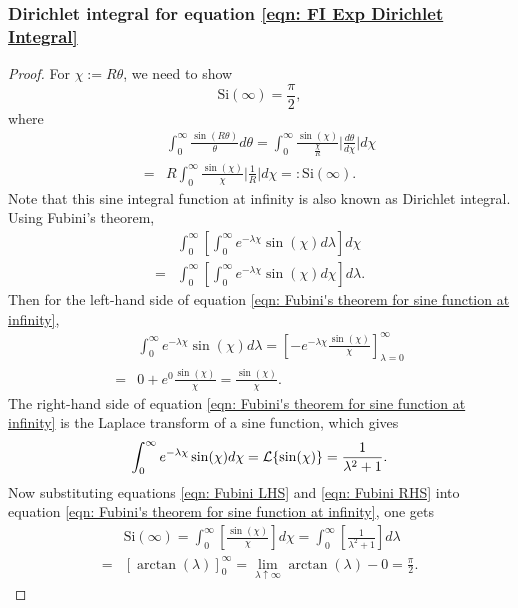 \documentclass[%
 reprint,
 amsmath,amssymb,
 aps,
]{revtex4-2}
\begin{document}
\subsubsection{Dirichlet integral for equation \eqref{eqn: FI Exp Dirichlet Integral}}
\begin{proof}
    For $\chi := R\theta$, we need to show
    \begin{equation*}
        \text{Si}(\infty) = \frac{\pi}{2},
    \end{equation*}
    where
    \begin{align*}
        & \int_0^\infty \frac{\sin(R\theta)}{\theta} d\theta
        = \int_0^\infty \frac{\sin(\chi)}{\frac{\chi}{R}} \bigg|\frac{d\theta}{d\chi}\bigg| d\chi \\
        = & R \int_0^\infty \frac{\sin(\chi)}{\chi} \bigg|\frac{1}{R}\bigg| d\chi 
        =: \text{Si}(\infty).
    \end{align*}
    Note that this sine integral function at infinity is also known as Dirichlet integral.
    Using Fubini's theorem,
    \begin{align} \label{eqn: Fubini's theorem for sine function at infinity}
        & \int_0^\infty\left[\int_0^\infty e^{-\lambda\chi}\sin(\chi)d\lambda\right]d\chi \\
        = & \int_0^\infty\left[\int_0^\infty e^{-\lambda\chi}\sin(\chi)d\chi\right]d\lambda.
    \end{align}
    Then for the left-hand side of equation \eqref{eqn: Fubini's theorem for sine function at infinity},
    \begin{align} \label{eqn: Fubini LHS}
        & \int_0^\infty e^{-\lambda\chi}\sin(\chi)d\lambda = \left[-e^{-\lambda\chi}\frac{\sin(\chi)}{\chi} \right]_{\lambda = 0}^\infty \\
        = & 0 + e^0\frac{\sin(\chi)}{\chi} = \frac{\sin(\chi)}{\chi}.
    \end{align}
    The right-hand side of equation \eqref{eqn: Fubini's theorem for sine function at infinity} is the Laplace transform of a sine function, which gives
    \begin{equation} \label{eqn: Fubini RHS}
        \int_0^\infty e^{-\lambda\chi}\sin(\chi)d\chi \\
        = \mathcal{L}\{\sin(\chi)\} = \frac{1}{\lambda^2 + 1}.
    \end{equation}
    Now substituting equations \eqref{eqn: Fubini LHS} and \eqref{eqn: Fubini RHS} into equation \eqref{eqn: Fubini's theorem for sine function at infinity}, one gets
    \begin{align*}
        & \text{Si}(\infty) = \int_0^\infty\left[\frac{\sin(\chi)}{\chi}\right]d\chi = \int_0^\infty\left[\frac{1}{\lambda^2 + 1}\right]d\lambda \\
        = & [\arctan(\lambda)]_0^\infty
        = \lim_{\lambda \uparrow \infty}\arctan(\lambda) - 0 = \frac{\pi}{2}.
    \end{align*}
\end{proof}
\end{document}
